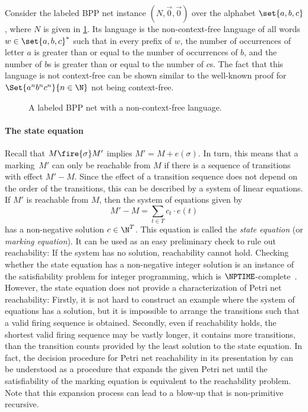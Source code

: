 \documentclass[../../diss.tex]{subfiles}
\begin{document}
\begin{example}%
\label{Example:BPPNonRegular}%
    Consider the labeled BPP net instance $(N,\vec{0},\vec{0})$ over the alphabet $\set{a,b,c}$, where $N$ is given in \cref{Figure:BPPNonRegularExample}.
    Its language is the non-context-free language of all words $w \in \set{a,b,c}^*$ such that in every prefix of $w$, the number of occurrences of letter $a$ is greater than or equal to the number of occurrences of $b$, and the number of $b$s is greater than or equal to the number of $c$s.
    The fact that this language is not context-free can be shown similar to the well-known proof for $\Set{a^n b^n c^n}{n \in \N}$ not being context-free.
\end{example}

\begin{figure}
    \centering%
    \caption{A labeled BPP net with a non-context-free language.}%
    \label{Figure:BPPNonRegularExample}%
\end{figure}

\paragraph{The state equation}

Recall that $M \fire{\sigma} M'$ implies $M' = M + e(\sigma)$.
In turn, this means that a marking~$M'$ can only be reachable from $M$ if there is a sequence of transitions with effect $M' - M$.
Since the effect of a transition sequence does not depend on the order of the transitions, this can be described by a system of linear equations.
If $M'$ is reachable from $M$, then the system of equations given by
\[
   M' - M = \sum_{t \in T} c_t \cdot e(t)
\]
has a non-negative solution $c \in \N^T$.
This equation is called the \emph{state equation} (or \emph{marking equation}).
It can be used as an easy preliminary check to rule out reachability: If the system has no solution, reachability cannot hold.
Checking whether the state equation has a non-negative integer solution is an instance of the satisfiability problem for integer programming, which is $\NPTIME$-complete~\cite{Karp72,BoroshT76}.
However, the state equation does not provide a characterization of Petri net reachability:
Firstly, it is not hard to construct an example where the system of equations has a solution, but it is impossible to arrange the transitions such that a valid firing sequence is obtained.
Secondly, even if reachability holds, the shortest valid firing sequence may be vastly longer, \ie it contains more transitions, than the transition counts provided by the least solution to the state equation.
In fact, the decision procedure for Petri net reachability in its presentation by  can be understood as a procedure that expands the given Petri net until the satisfiability of the marking equation is equivalent to the reachability problem.
Note that this expansion process can lead to a blow-up that is non-primitive recursive.
\end{document}
